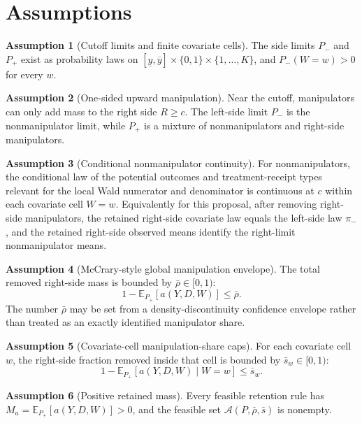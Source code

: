 \documentclass[11pt]{article}
\newcommand{\E}{\mathbb{E}}
\theoremstyle{definition}
\newtheorem{assumption}{Assumption}
\theoremstyle{plain}
\theoremstyle{remark}
\begin{document}
\section{Assumptions}
\begin{assumption}[Cutoff limits and finite covariate cells]\label{ass:cutoff-limits}
The side limits \(P_-\) and \(P_+\) exist as probability laws on
\([\underline y,\overline y]\times\{0,1\}\times\{1,\ldots,K\}\), and
\(P_-(W=w)>0\) for every \(w\).
\end{assumption}

\begin{assumption}[One-sided upward manipulation]\label{ass:one-sided}
Near the cutoff, manipulators can only add mass to the right side \(R\ge c\).
The left-side limit \(P_-\) is the nonmanipulator limit, while \(P_+\) is a mixture of
nonmanipulators and right-side manipulators.
\end{assumption}

\begin{assumption}[Conditional nonmanipulator continuity]\label{ass:conditional-continuity}
For nonmanipulators, the conditional law of the potential outcomes and treatment-receipt
types relevant for the local Wald numerator and denominator is continuous at \(c\) within
each covariate cell \(W=w\).  Equivalently for this proposal, after removing right-side
manipulators, the retained right-side covariate law equals the left-side law \(\pi_-\), and
the retained right-side observed means identify the right-limit nonmanipulator means.
\end{assumption}

\begin{assumption}[McCrary-style global manipulation envelope]\label{ass:global-envelope}
The total removed right-side mass is bounded by \(\bar\rho\in[0,1)\):
\[
  1-\E_{P_+}[a(Y,D,W)] \le \bar\rho .
\]
The number \(\bar\rho\) may be set from a density-discontinuity confidence envelope rather
than treated as an exactly identified manipulator share.
\end{assumption}

\begin{assumption}[Covariate-cell manipulation-share caps]\label{ass:cell-caps}
For each covariate cell \(w\), the right-side fraction removed inside that cell is bounded
by \(\bar s_w\in[0,1)\):
\[
  1-\E_{P_+}[a(Y,D,W)\mid W=w]\le \bar s_w .
\]
\end{assumption}

\begin{assumption}[Positive retained mass]\label{ass:positive-retained}
Every feasible retention rule has \(M_a=\E_{P_+}[a(Y,D,W)]>0\), and the feasible set
\(\mathcal A(P,\bar\rho,\bar s)\) is nonempty.
\end{assumption}
\end{document}
